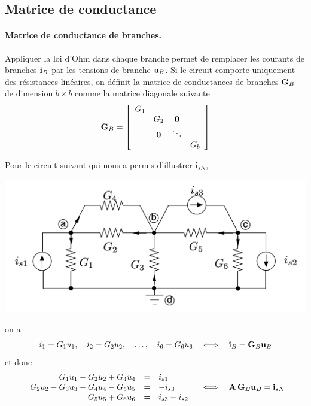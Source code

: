 \subsection{Matrice de conductance}
\paragraph{Matrice de conductance de branches.} %
Appliquer la loi d'Ohm dans chaque branche permet de remplacer les courants de branches ${\bf i}_B$ par les tensions de branche ${\bf u}_B$. Si le circuit comporte uniquement des résistances linéaires, on définit la matrice de conductances de branches ${\bf G}_B$ de dimension $b \times b$ comme la matrice diagonale suivante
\[{\bf G}_B = \left[
\begin{array}{cccc}
G_1 & \\
& G_2 & {\bf 0} & \\
&  {\bf 0} & \ddots \\
& & & G_b
\end{array} \right]\]

\begin{testexample}
Pour le circuit suivant qui nous a permis d'illustrer $\mathbf{i}_{sN}$,
\begin{center}
	\includegraphics[width=0.7\linewidth]{figs/methodes-generales/exemple_iSN}
\end{center}
on a 
\[
i_1 =  G_1 u_{1}, \quad 
i_2 =  G_2 u_{2}, \quad 
\ldots , \quad 
i_6 =  G_6 u_{6}
\quad \Longleftrightarrow \quad {\bf i}_B = {\bf G}_B {\bf u}_B
\]
et donc 
\[\begin{array}{rcl}
G_1 u_1-G_2 u_2+G_4 u_4 & = & i_{s1}\\
G_2 u_2-G_3 u_3-G_4 u_4-G_5 u_5 & = & -i_{s3}\\
G_5 u_5+G_6 u_6 & = & i_{s3}-i_{s2}
\end{array}
\quad \Longleftrightarrow \quad {\bf A}\,{\bf G}_B{\bf u}_B = {\bf i}_{sN}
\]
\end{testexample}


